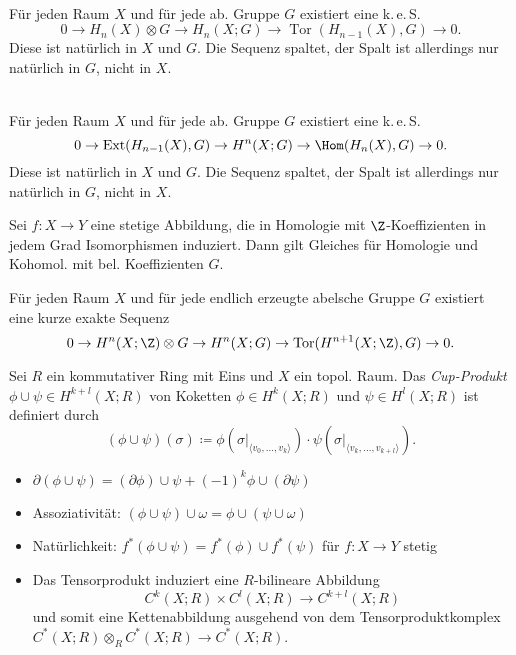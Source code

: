 \documentclass{cheat-sheet}
\newcommand{\angles}[1]{{\langle #1 \rangle}}
\DeclareMathOperator{\Tor}{Tor}
\DeclareMathOperator{\Ext}{Ext}
\newcommand{\keS}{k.\,e.\,S.} %
\begin{document}

\begin{satz}\mbox{}\\
  Für jeden Raum $X$ und für jede ab. Gruppe $G$ existiert eine \keS{}
  \[ 0 \to H_n(X) \otimes G \to H_n(X; G) \to \Tor(H_{n-1}(X), G) \to 0. \]
  Diese ist natürlich in $X$ und $G$. Die Sequenz spaltet, der Spalt ist allerdings nur natürlich in $G$, nicht in $X$.
\end{satz}

\begin{satz}\mbox{}\\
  Für jeden Raum $X$ und für jede ab. Gruppe $G$ existiert eine \keS{}
  \[ 0 \to \Ext(H_{n-1}(X), G) \to H^n(X; G) \to \Hom(H_n(X), G) \to 0. \]
  Diese ist natürlich in $X$ und $G$. Die Sequenz spaltet, der Spalt ist allerdings nur natürlich in $G$, nicht in $X$.
\end{satz}

\begin{kor}
  Sei $f : X \to Y$ eine stetige Abbildung, die in Homologie mit $\Z$-Koeffizienten in jedem Grad Isomorphismen induziert. Dann gilt Gleiches für Homologie und Kohomol. mit bel. Koeffizienten $G$.
\end{kor}

\begin{satz}
  Für jeden Raum $X$ und für jede endlich erzeugte abelsche Gruppe $G$ existiert eine kurze exakte Sequenz
  \[ 0 \to H^n(X; \Z) \otimes G \to H^n(X; G) \to \Tor(H^{n+1}(X; \Z), G) \to 0. \]
\end{satz}



\begin{defn}
  Sei $R$ ein kommutativer Ring mit Eins und $X$ ein topol. Raum. Das \emph{Cup-Produkt} $\phi \cup \psi \in H^{k+l}(X; R)$ von Koketten $\phi \in H^k(X; R)$ und $\psi \in H^l(X; R)$ ist definiert durch
  \[ (\phi \cup \psi)(\sigma) \coloneqq \phi(\sigma|_\angles{v_0, \ldots, v_k}) \cdot \psi(\sigma|_\angles{v_k, \ldots, v_{k+l}}). \]
\end{defn}

\begin{lem}
  \begin{itemize}
    \item $\partial (\phi \cup \psi) = (\partial \phi) \cup \psi + (-1)^k \phi \cup (\partial \psi)$
    \item Assoziativität: $(\phi \cup \psi) \cup \omega = \phi \cup (\psi \cup \omega)$
    \item Natürlichkeit: $f^*(\phi \cup \psi) = f^*(\phi) \cup f^*(\psi)$ für $f : X \to Y$ stetig
    \item Das Tensorprodukt induziert eine $R$-bilineare Abbildung
    \[ C^k(X; R) \times C^l(X; R) \to C^{k+l}(X; R) \]
    und somit eine Kettenabbildung ausgehend von dem Tensorproduktkomplex
    $C^*(X; R) \otimes_R C^*(X; R) \to C^*(X; R)$.
  \end{itemize}
\end{lem}
\end{document}
